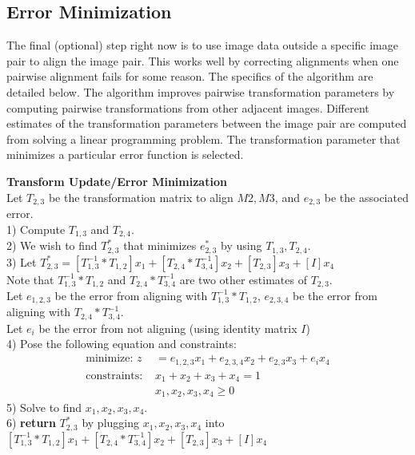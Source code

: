 \documentclass{article}
\begin{document}
\subsection{Error Minimization}
The final (optional) step right now is to use image data outside a specific image pair to align the image pair. This works well by correcting alignments when one pairwise alignment fails for some reason. The specifics of the algorithm are detailed below. The algorithm improves pairwise transformation parameters by computing pairwise transformations from other adjacent images. Different estimates of the transformation parameters between the image pair are computed from solving a linear programming problem. The transformation parameter that minimizes a particular error function is selected.
	\begin{algorithm}
	\DontPrintSemicolon
	\textbf{Transform Update/Error Minimization}\\
	Let $T_{2,3}$ be the transformation matrix to align $M2, M3$, and $e_{2,3}$ be the associated error.\\
	1) Compute $T_{1,3}$ and $T_{2,4}$.\\
	2) We wish to find $T_{2,3}^{*}$ that minimizes $e_{2,3}^{*}$ by using $T_{1,3},T_{2,4}$.\\
	3) Let $T_{2,3}^{*} = [T_{1,3}^{-1}*T_{1,2}]x_1 + [T_{2,4}*T_{3,4}^{-1}]x_2 + [T_{2,3}]x_3 + [I]x_4$\\
	Note that $T_{1,3}^{-1}*T_{1,2}$ and $T_{2,4}*T_{3,4}^{-1}$ are two other estimates of $T_{2,3}$.\\
	Let $e_{1,2,3}$ be the error from aligning with $T_{1,3}^{-1}*T_{1,2}$, $e_{2,3,4}$ be the error from aligning with $T_{2,4}*T_{3,4}^{-1}$.\\
	Let $e_i$ be the error from not aligning (using identity matrix $I$) \\
 	4) Pose the following equation and constraints:
	\begin{align*}
	 \text{minimize: } z &= e_{1,2,3}x_1 +  e_{2,3,4}x_2 + e_{2,3}x_3 + e_ix_4\\
	 \text{constraints: }&x_1 + x_2 + x_3 + x_4 = 1\\
	 &x_1, x_2, x_3, x_4 \ge 0
	\end{align*}
	5) Solve to find $x_1, x_2, x_3, x_4$.\\
	6) \textbf{return} $T_{2,3}^{*}$ by plugging $x_1, x_2, x_3, x_4$ into $[T_{1,3}^{-1}*T_{1,2}]x_1 + [T_{2,4}*T_{3,4}^{-1}]x_2 + [T_{2,3}]x_3 + [I]x_4$
	\end{algorithm}\\
\end{document}
